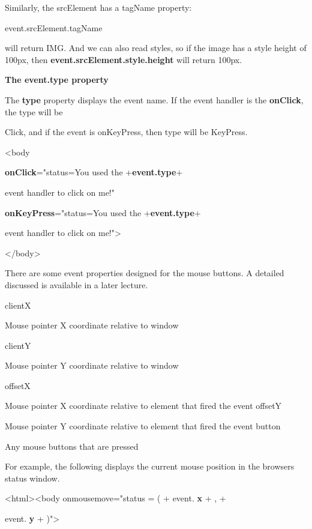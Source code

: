 \documentclass[
]{article}
\begin{document}
Similarly, the srcElement has a tagName property:

event.srcElement.tagName

will return \textquotesingle IMG\textquotesingle. And we can also read
styles, so if the image has a style height of 100px, then
\textbf{event.srcElement.style.height} will return
\textquotesingle100px\textquotesingle.

\textbf{The event.type property}

The \textbf{type} property displays the event name. If the event handler
is the \textbf{onClick}, the type will be

\textquotesingle Click\textquotesingle, and if the event is onKeyPress,
then type will be \textquotesingle KeyPress\textquotesingle.

\textless body

\textbf{onClick}="status=\textquotesingle You used the
\textquotesingle+\textbf{event.type}+\textquotesingle{}

event handler to click on me!\textquotesingle"

\textbf{onKeyPress}="status=\textquotesingle You used the
\textquotesingle+\textbf{event.type}+\textquotesingle{}

event handler to click on me!\textquotesingle"\textgreater{}

\textless/body\textgreater{}

There are some event properties designed for the mouse buttons. A
detailed discussed is available in a later lecture.

clientX

Mouse pointer X coordinate relative to window

clientY

Mouse pointer Y coordinate relative to window

offsetX

Mouse pointer X coordinate relative to element that fired the event
offsetY

Mouse pointer Y coordinate relative to element that fired the event
button

Any mouse buttons that are pressed

For example, the following displays the current mouse position in the
browser\textquotesingle s status window.

\textless html\textgreater\textless body onmousemove="status =
\textquotesingle(\textquotesingle{} + event. \textbf{x} +
\textquotesingle, \textquotesingle{} +

event. \textbf{y} + \textquotesingle)\textquotesingle"\textgreater{}
\end{document}

